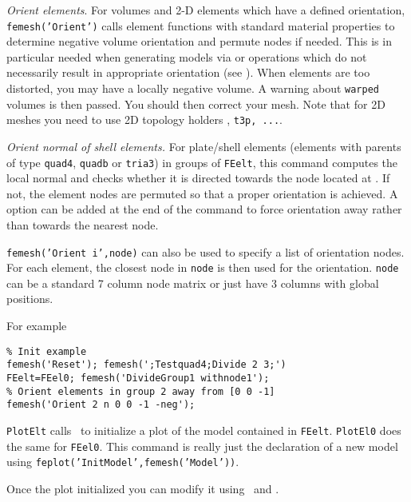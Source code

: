 {\sl Orient elements}.  For volumes and 2-D elements which have a defined orientation, {\tt femesh('Orient')} calls element functions with standard material properties to determine negative volume orientation and permute nodes if needed. This is in particular needed when generating models via  or  operations which do not necessarily result in appropriate orientation (see \integrules). When elements are too distorted, you may have a locally negative volume. A warning about {\tt warped} volumes is then passed. You should then correct your mesh. Note that for 2D meshes you need to use 2D topology holders \qfourp, {\tt t3p, ...}.

{\sl Orient normal of shell elements.} For plate/shell elements (elements with parents of type {\tt quad4}, {\tt quadb} or {\tt tria3}) in groups  of {\tt FEelt}, this command computes the local normal and checks whether it is directed towards the node located at . If not, the element nodes are permuted so that a proper orientation is achieved. A  option can be added at the end of the command to force orientation away rather than towards the nearest node.

{\tt femesh('Orient {\ti i}',node)} can also be used to specify a list of orientation nodes. For each element, the closest node in {\tt node}  is then used for the orientation. {\tt node} can be a standard 7 column node matrix or just have 3 columns with global positions.

For example

\begin{verbatim}
% Init example
femesh('Reset'); femesh(';Testquad4;Divide 2 3;')
FEelt=FEel0; femesh('DivideGroup1 withnode1'); 
% Orient elements in group 2 away from [0 0 -1]
femesh('Orient 2 n 0 0 -1 -neg');
\end{verbatim}%


 {\tt PlotElt} calls \feplot\ to initialize a plot of the model contained in {\tt FEelt}. {\tt PlotEl0} does the same for {\tt FEel0}. This command is really just the declaration of a new model using  {\tt feplot('InitModel',femesh('Model'))}.

Once the plot initialized you can modify it using \feplot\ and \fecom. 


